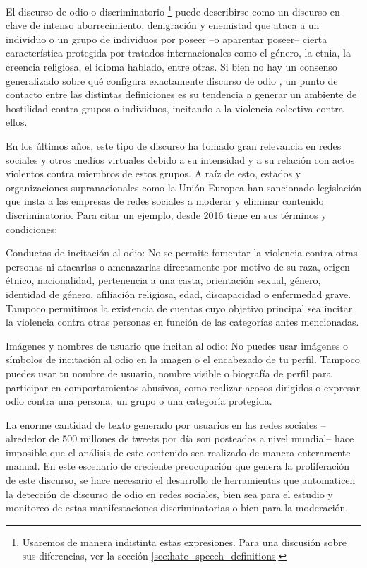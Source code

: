 \label{chap:01_intro}

El discurso de odio o discriminatorio \footnote{Usaremos de manera indistinta estas expresiones. Para una discusión sobre sus diferencias, ver la sección \ref{sec:hate_speech_definitions}} puede describirse como un discurso en clave de intenso aborrecimiento, denigración y enemistad que ataca a un individuo o un grupo de individuos por poseer --o aparentar poseer-- cierta característica protegida por tratados internacionales como el género, la etnia, la creencia religiosa, el idioma hablado, entre otras. Si bien no hay un consenso generalizado sobre qué configura exactamente discurso de odio \cite{article192015}, un punto de contacto entre las distintas definiciones es su tendencia a generar un ambiente de hostilidad contra grupos o individuos, incitando a la violencia colectiva contra ellos.

En los últimos años, este tipo de discurso ha tomado gran relevancia en redes sociales y otros medios virtuales debido a su intensidad y a su relación con actos violentos contra miembros de estos grupos. A raíz de esto, estados y organizaciones supranacionales como la Unión Europea han sancionado legislación que insta a las empresas de redes sociales a moderar y eliminar contenido discriminatorio. Para citar un ejemplo, desde 2016 \twitter{} tiene en sus términos y condiciones:

\begin{displayquote}
    Conductas de incitación al odio: No se permite fomentar la violencia contra otras personas ni atacarlas o amenazarlas directamente por motivo de su raza, origen étnico, nacionalidad, pertenencia a una casta, orientación sexual, género, identidad de género, afiliación religiosa, edad, discapacidad o enfermedad grave. Tampoco permitimos la existencia de cuentas cuyo objetivo principal sea incitar la violencia contra otras personas en función de las categorías antes mencionadas.

    Imágenes y nombres de usuario que incitan al odio: No puedes usar imágenes o símbolos de incitación al odio en la imagen o el encabezado de tu perfil. Tampoco puedes usar tu nombre de usuario, nombre visible o biografía de perfil para participar en comportamientos abusivos, como realizar acosos dirigidos o expresar odio contra una persona, un grupo o una categoría protegida.
\end{displayquote}

La enorme cantidad de texto generado por usuarios en las redes sociales --alrededor de 500 millones de tweets por día son posteados a nivel mundial-- hace imposible que el análisis de este contenido sea realizado de manera enteramente manual. En este escenario de creciente preocupación que genera la proliferación de este discurso, se hace necesario el desarrollo de herramientas que automaticen la detección de discurso de odio en redes sociales, bien sea para el estudio y monitoreo de estas manifestaciones discriminatorias o bien para la moderación.

